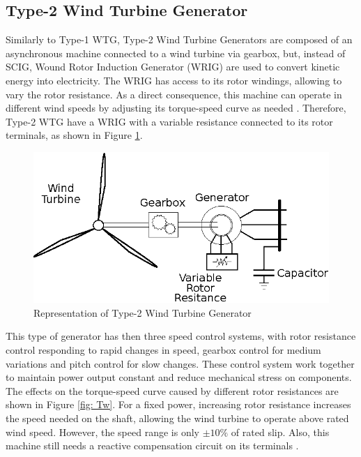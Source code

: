 \subsection{Type-2 Wind Turbine Generator}

Similarly to Type-1 WTG, Type-2 Wind Turbine Generators are composed of an asynchronous machine connected to a wind turbine via gearbox, but, instead of SCIG, Wound Rotor Induction Generator (WRIG) are used to convert kinetic energy into electricity. The WRIG has access to its rotor windings, allowing to vary the rotor resistance. As a direct consequence, this machine can operate in different wind speeds by adjusting its torque-speed curve as needed \cite{Ellis2011}. Therefore, Type-2 WTG have a WRIG with a variable resistance connected to its rotor terminals, as shown in Figure \ref{fig: WTG2}.

\begin{figure}[h]
	\caption{Representation of Type-2 Wind Turbine Generator}
	\begin{center}
		\includegraphics[scale=1]{Images/Type2WTG.eps}
	\end{center}
	\label{fig: WTG2}
\end{figure}

This type of generator has then three speed control systems, with rotor resistance control responding to rapid changes in speed, gearbox control for medium variations and pitch control for slow changes. These control system work together to maintain power output constant and reduce mechanical stress on components. The effects on the torque-speed curve caused by different rotor resistances are shown in Figure \ref{fig: Tw}. For a fixed power, increasing rotor resistance increases the speed needed on the shaft, allowing the wind turbine to operate above rated wind speed. However, the speed range is only $\pm 10\%$ of rated slip. Also, this machine still needs a reactive compensation circuit on its terminals \cite{Muljadi2010}.

